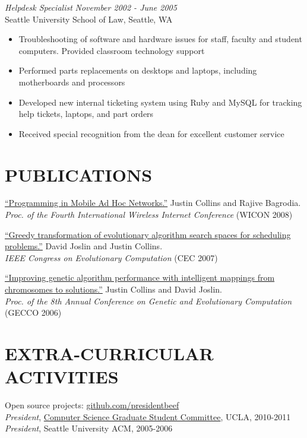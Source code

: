 \documentclass[margin]{res}
\begin{document}
\begin{resume}
{\sl Helpdesk Specialist} \hfill \textit{November 2002 - June 2005} \\
		Seattle University School of Law, Seattle, WA 
		\begin{itemize}  \itemsep -2pt %
		\item Troubleshooting of software and hardware issues for staff, faculty and student computers. Provided classroom technology support
		\item Performed parts replacements on desktops and laptops, including motherboards and processors
		\item Developed new internal ticketing system using Ruby and MySQL for tracking help tickets, laptops, and part orders
		\item Received special recognition from the dean for excellent customer service
		\end{itemize}

		\section{PUBLICATIONS}
		\href{http://cs.ucla.edu/~collins/documents/Justin_Collins-WICON08.pdf}{``Programming in Mobile Ad Hoc Networks.''} Justin Collins and Rajive Bagrodia. \\
{\it Proc. of the Fourth International Wireless Internet Conference} (WICON 2008)

\href{http://cs.ucla.edu/~collins/documents/Joslin_Collins-Greedy_Transformations_of_Search_Spaces.pdf}{``Greedy transformation of evolutionary algorithm search spaces for scheduling problems.''} David Joslin and Justin Collins.\\
{\it IEEE Congress on Evolutionary Computation} (CEC 2007)

\href{http://cs.ucla.edu/~collins/documents/Collins_Joslin-GECCO06-abstract.pdf}{``Improving genetic algorithm performance with intelligent mappings from chromosomes to solutions.''} Justin Collins and David Joslin. \\
{\it Proc. of the 8th Annual Conference on Genetic and Evolutionary Computation} (GECCO 2006)

\section{EXTRA-CURRICULAR \\ ACTIVITIES}             
Open source projects: \href{http://github.com/presidentbeef}{github.com/presidentbeef}\\
{\sl President}, \href{http://csgsc.cs.ucla.edu/}{Computer Science Graduate Student Committee}, UCLA, 2010-2011 \\
{\sl President}, Seattle University ACM, 2005-2006

\end{resume}
\end{document}
